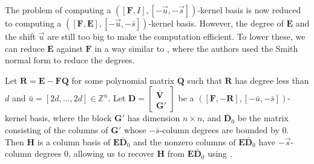 The problem of computing a $\left(\left[\mathbf{F},I\right],\left[-\vec{u},-\vec{s}\right]\right)$-kernel
basis is now reduced to computing a $\left(\left[\mathbf{F},\mathbf{E}\right],\left[-\vec{u},-\bar{s}\right]\right)$-kernel
basis. However, the degree of $\mathbf{E}$ and the shift $\vec{u}$
are still too big to make the computation efficient. To lower these,
we can reduce $\mathbf{E}$ against $\mathbf{F}$ in a way similar
to \citep{GS2011,G2011}, where the authors used the Smith normal
form to reduce the degrees. 
\begin{lem}
\label{lem:reduceToRemainder}Let $\mathbf{R}=\mathbf{E}-\mathbf{F}\mathbf{Q}$
for some polynomial matrix $\mathbf{Q}$ such that $\mathbf{R}$ has
degree less than $d$ and $\bar{u}=\left[2d,\dots,2d\right]\in\mathbb{Z}^{n}$.
Let $\mathbf{D}=\begin{bmatrix}\bar{\mathbf{V}}\\
\mathbf{G}'
\end{bmatrix}$ be a $\left(\left[\mathbf{F},-\mathbf{R}\right],\left[-\bar{u},-\bar{s}\right]\right)$-kernel
basis, where the block $\mathbf{G}'$ has dimension $n\times n$,
and $\bar{\mathbf{D}}_{0}$ be the matrix consisting of the columns
of $\mathbf{G}'$ whose $-\bar{s}$-column degrees are bounded by
0. Then $\mathbf{H}$ is a column basis of $\mathbf{E}\bar{\mathbf{D}}_{0}$
and the nonzero columns of $\mathbf{E}\bar{\mathbf{D}}_{0}$ have
$-\vec{s}$-column degrees 0, allowing us to recover $\mathbf{H}$
from $\mathbf{E}\bar{\mathbf{D}}_{0}$ using .\end{lem}

